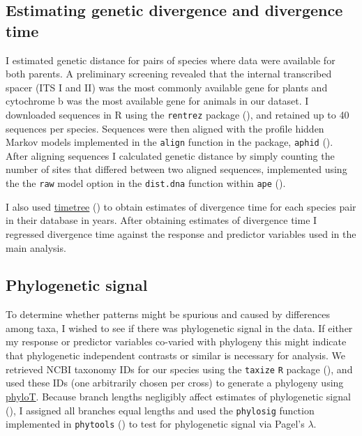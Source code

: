 \documentclass[times, twoside, watermark]{zHenriquesLab-StyleBioRxiv}
\begin{document}
\subsection{Estimating genetic divergence and divergence time}

I estimated genetic distance for pairs of species where data were available for both parents. A preliminary screening revealed that the internal transcribed spacer (ITS I and II) was the most commonly available gene for plants and cytochrome b was the most available gene for animals in our dataset. I downloaded sequences in R using the \texttt{rentrez} package (\citealt{Winter2017}), and retained up to 40 sequences per species. Sequences were then aligned with the profile hidden Markov models implemented in the \texttt{align} function in the package, \texttt{aphid} (\citealt{Wilkinson2018}). After aligning sequences I calculated genetic distance by simply counting the number of sites that differed between two aligned sequences, implemented using the the \texttt{raw} model option in the \texttt{dist.dna} function within \texttt{ape} (\citealt{Paradis2018}). \par

I also used \href{http://timetree.org}{timetree} (\citealt{Kumar2017}) to obtain estimates of divergence time for each species pair in their database in years. After obtaining estimates of divergence time I regressed divergence time against the response and predictor variables used in the main analysis.

\subsection{Phylogenetic signal}
To determine whether patterns might be spurious and caused by differences among taxa, I wished to see if there was phylogenetic signal in the data. If either my response or predictor variables co-varied with phylogeny this might indicate that phylogenetic independent contrasts or similar is necessary for analysis. We retrieved NCBI taxonomy IDs for our species using the \texttt{taxize} \texttt{R} package (\citealt{Chamberlain2013}), and used these IDs (one arbitrarily chosen per cross) to generate a phylogeny using \href{https://phylot.biobyte.de/}{phyloT}. Because branch lengths negligibly affect estimates of phylogenetic signal (\citealt{Munkemuller2012}), I assigned all branches equal lengths and used the \texttt{phylosig} function implemented in \texttt{phytools} (\citealt{Revell2012}) to test for phylogenetic signal via Pagel's \textit{$\lambda$}.
\end{document}
